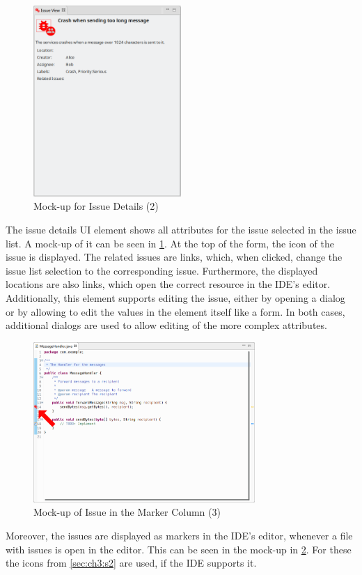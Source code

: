 \begin{figure}[!h]
	\centering
	\includegraphics[width=0.5\textwidth]{graphics/concept_mockup_issueDetails.png}
	\caption{Mock-up for Issue Details (2)}
	\label{fig:c3:mockup_issueDetails}
\end{figure}
The issue details \gls{UI} element shows all attributes for the issue selected in the issue list.
A mock-up of it can be seen in \cref{fig:c3:mockup_issueDetails}.
At the top of the form, the icon of the issue is displayed.
The related issues are links, which, when clicked, change the issue list selection to the corresponding issue.
Furthermore, the displayed locations are also links, which open the correct resource in the \gls{IDE}'s editor.
Additionally, this element supports editing the issue, either by opening a dialog or by allowing to edit the values in the element itself like a form.
In both cases, additional dialogs are used to allow editing of the more complex attributes. 

\begin{figure}[!h]
	\centering
	\includegraphics[width=0.75\textwidth]{graphics/concept_mockup_issueMarker_arrow.png}
	\caption{Mock-up of Issue in the Marker Column (3)}
	\label{fig:c3:mockup_issueMarkers}
\end{figure}
Moreover, the issues are displayed as markers in the \gls{IDE}'s editor, whenever a file with issues is open in the editor.
This can be seen in the mock-up in \cref{fig:c3:mockup_issueMarkers}. 
For these the icons from \cref{sec:ch3:s2} are used, if the \gls{IDE} supports it.

